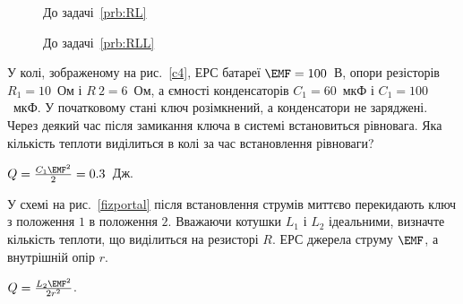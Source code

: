 \begin{figure}[h!]\centering
	\begin{minipage}[b]{0.45\linewidth}\centering
		\caption{До задачі~\ref{prb:RL}}
		\label{RL}
	\end{minipage}
	\begin{minipage}[b]{0.45\linewidth}\centering
		\caption{До задачі~\ref{prb:RLL}}
		\label{RLL}
	\end{minipage}
\end{figure}

\begin{problem}\label{prb:c4}
У колі, зображеному на рис.~\ref{c4}, ЕРС батареї $\EMF = 100$~В, опори резісторів $R_1 = 10$~Ом і $R~2 = 6$~Ом, а ємності конденсаторів $C_1 = 60$~мкФ і $C_1 = 100$~мкФ. У початковому стані ключ розімкнений, а конденсатори не заряджені. Через деякий час після замикання ключа в системі встановиться рівновага. Яка кількість теплоти виділиться в колі за час встановлення рівноваги?
\begin{solution}
	$Q = \frac{C_1\EMF^2}{2} = 0.3$~Дж.
\end{solution}
\end{problem}

\begin{problem}\label{prb:fizportal}
У схемі на рис.~\ref{fizportal} після встановлення струмів миттєво перекидають ключ з положення $1$ в положення $2$. Вважаючи котушки $L_1$ і $L_2$ ідеальними, визначте кількість теплоти, що виділиться на резисторі $R$. ЕРС джерела струму $\EMF$, а внутрішній опір $r$.
\begin{solution}
	$Q = \frac{L_2\EMF^2}{2r^2}$.
\end{solution}
\end{problem}

